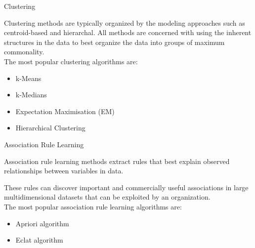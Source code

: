\documentclass{beamer}
\begin{document}
\begin{frame}{Clustering}
\begin{flushleft}
	Clustering methods are typically organized by the modeling approaches such as centroid-based and hierarchal. All methods are concerned with using the inherent structures in the data to best organize the data into groups of maximum commonality.
\\
\vspace{10pt}
The most popular clustering algorithms are:
\begin{itemize}
	\item k-Means
	\item k-Medians
	\item Expectation Maximisation (EM)
	\item Hierarchical Clustering
\end{itemize}

	\end{flushleft}
\end{frame}

\begin{frame}{Association Rule Learning}
\begin{flushleft}
	Association rule learning methods extract rules that best explain observed relationships between variables in data.

These rules can discover important and commercially useful associations in large multidimensional datasets that can be exploited by an organization.
\\
\vspace{10pt}
The most popular association rule learning algorithms are:

\begin{itemize}
	\item Apriori algorithm
	\item Eclat algorithm
\end{itemize}

	\end{flushleft}
\end{frame}
\end{document}
